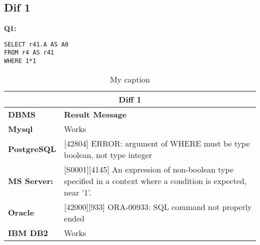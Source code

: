 \subsection{Dif 1}

\textbf{Q1:}
\begin{mdframed}[backgroundcolor=lightgray!20] 
\begin{lstlisting}[style=SQL]
SELECT r41.A AS A0
FROM r4 AS r41
WHERE 1*1
\end{lstlisting}
\end{mdframed}

\begin{table}[h]
\centering
\caption{My caption}
\label{my-label}
\begin{tabular}{|p{2cm}|p{12cm}|}
\hline
\multicolumn{2}{|c|}{\textbf{Diff 1}}                                                                                                                                                       \\ \hline
\textbf{DBMS}                              & \textbf{Result Message}                                                                                                                        \\ \hline
{\color[HTML]{333333} \textbf{Mysql}}      & {\color[HTML]{333333} Works}                                                                                                                   \\ \hline
{\color[HTML]{333333} \textbf{PostgreSQL}} & {\color[HTML]{333333} {[}42804{]} ERROR: argument of WHERE must be type boolean, not type integer}                                             \\ \hline
{\color[HTML]{333333} \textbf{MS Server:}} & {\color[HTML]{333333} {[}S0001{]}{[}4145{]} An expression of non-boolean type specified in a context where a condition is expected, near '1'.} \\ \hline
\textbf{Oracle}                            & {[}42000{]}{[}933{]} ORA-00933: SQL command not properly ended                                                                                 \\ \hline
\textbf{IBM DB2}                           & Works                                                                                                                                          \\ \hline
\end{tabular}
\end{table}


